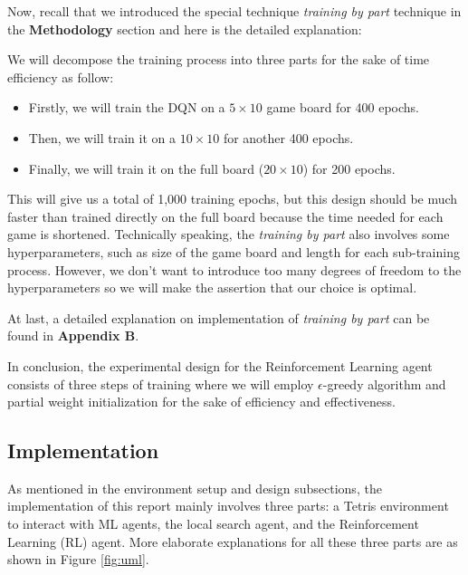 \documentclass[letterpaper]{article} %
\begin{document}
\begin{itemize}
  Now, recall that we introduced the special technique \textit{training by part} technique in the \textbf{Methodology} section and here is the detailed explanation:
  
  We will decompose the training process into three parts for the sake of time efficiency as follow:
  \begin{itemize}
    \item 
    Firstly, we will train the DQN on a $5\times 10$ game board for 400 epochs.
    \item 
    Then, we will train it on a $10\times 10$ for another 400 epochs.
    \item 
    Finally, we will train it on the full board ($20\times 10$) for 200 epochs.
  \end{itemize}

  
  
  This will give us a total of 1,000 training epochs, but this design should be much faster than trained directly on the full board because the time needed for each game is shortened. Technically speaking, the \textit{training by part} also involves some hyperparameters, such as size of the game board and length for each sub-training process. However, we don't want to introduce too many degrees of freedom to the hyperparameters so we will make the assertion that our choice is optimal.
  
  At last, a detailed explanation on implementation of \textit{training by part} can be found in \textbf{Appendix B}.
  

  In conclusion, the experimental design for the Reinforcement Learning agent consists of three steps of training where we will employ $\epsilon$-greedy algorithm and partial weight initialization for the sake of efficiency and effectiveness. 
\end{itemize}

\subsection{Implementation}

As mentioned in the environment setup and design subsections, the implementation of this report mainly involves three parts: a Tetris environment to interact with ML agents, the local search agent, and the Reinforcement Learning (RL) agent. More elaborate explanations for all these three parts are as shown in Figure \ref{fig:uml}.
\end{document}
